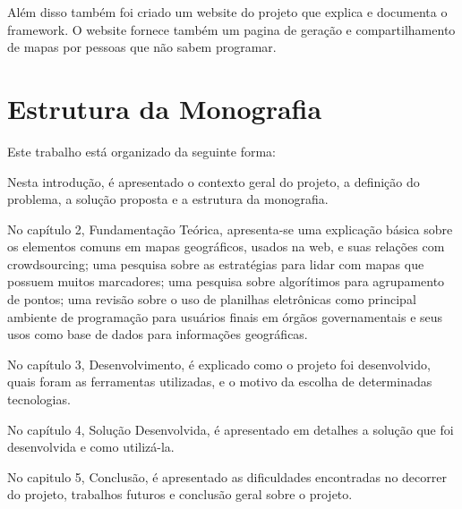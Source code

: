 Além disso também foi criado um website do projeto\cite{gitsite} que explica e documenta o framework. O website fornece também um pagina de geração e compartilhamento de mapas por pessoas que não sabem programar.

\section{Estrutura da Monografia}
Este trabalho está organizado da seguinte forma:

Nesta introdução, é apresentado o contexto geral do projeto, a definição do problema, a solução proposta e a estrutura da monografia.

No capítulo 2, Fundamentação Teórica, apresenta-se uma explicação básica sobre os elementos comuns em mapas geográficos, usados na web, e suas relações com crowdsourcing; uma pesquisa sobre as estratégias para lidar com mapas que possuem muitos marcadores; uma pesquisa sobre algorítimos para agrupamento de pontos; uma revisão sobre o uso de planilhas eletrônicas como principal ambiente de programação para usuários finais em órgãos governamentais e seus usos como base de dados para informações geográficas.

No capítulo 3, Desenvolvimento, é explicado como o projeto foi desenvolvido, quais foram as ferramentas utilizadas, e o motivo da escolha de determinadas tecnologias. 

No capítulo 4, Solução Desenvolvida, é apresentado em detalhes a solução que foi desenvolvida e como utilizá-la.

No capitulo 5, Conclusão, é apresentado as dificuldades encontradas no decorrer do projeto, trabalhos futuros e conclusão geral sobre o projeto.



